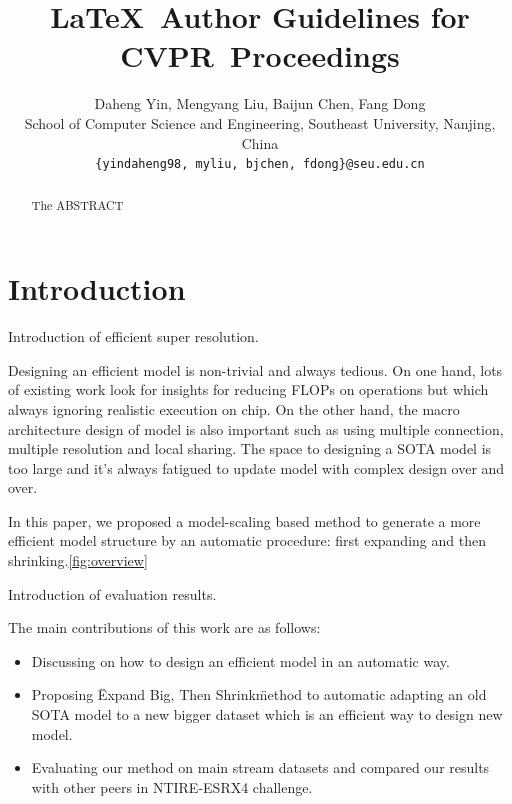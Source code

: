 \documentclass[10pt,twocolumn,letterpaper]{article}
\def\confName{CVPR}
\begin{document}
\title{\LaTeX\ Author Guidelines for \confName~Proceedings}


\author{Daheng Yin, Mengyang Liu, Baijun Chen, Fang Dong\\
School of Computer Science and Engineering, Southeast University, Nanjing, China\\
{\tt\small \{yindaheng98, myliu, bjchen, fdong\}@seu.edu.cn}
}
\maketitle

\begin{abstract}
   The ABSTRACT 
\end{abstract}

\section{Introduction}
\label{sec:intro}

Introduction of efficient super resolution.

Designing an efficient model is non-trivial and always tedious. On one hand, lots of existing work look for insights for reducing FLOPs on operations but which always ignoring realistic execution on chip. On the other hand, the macro architecture design of model is also important such as using multiple connection, multiple resolution and local sharing. The space to designing a SOTA model is too large and it's always fatigued to update model with complex design over and over.

In this paper, we proposed a model-scaling based method to generate a more efficient model structure by an automatic procedure: first expanding and then shrinking.\ref{fig:overview}

Introduction of evaluation results.

The main contributions of this work are as follows:

\begin{itemize}
    \item Discussing on how to design an efficient model in an automatic way.
    \item Proposing \"Expand Big, Then Shrink\" method to automatic adapting an old SOTA model to a new bigger dataset which is an efficient way to design new model.
    \item Evaluating our method on main stream datasets and compared our results with other peers in NTIRE-ESRX4 challenge.
\end{itemize}
\end{document}
